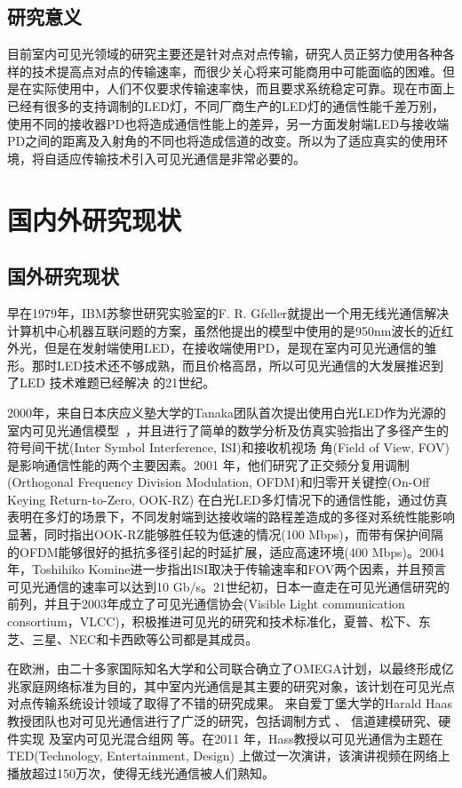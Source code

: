 \subsection{研究意义}

目前室内可见光领域的研究主要还是针对点对点传输，研究人员正努力使用各种各样的技术提高点对点的传输速率，而很少关心将来可能商用中可能面临的困难。但是在实际使用中，人们不仅要求传输速率快，而且要求系统稳定可靠。现在市面上已经有很多的支持调制的LED灯，不同厂商生产的LED灯的通信性能千差万别，使用不同的接收器PD也将造成通信性能上的差异，另一方面发射端LED与接收端PD之间的距离及入射角的不同也将造成信道的改变。所以为了适应真实的使用环境，将自适应传输技术引入可见光通信是非常必要的。

\section{国内外研究现状}\label{sec:stage}
\subsection{国外研究现状}
早在1979年，IBM苏黎世研究实验室的F. R. Gfeller就提出一个用无线光通信解决计算机中心机器互联问题的方案\cite{gfeller1979wireless}，虽然他提出的模型中使用的是950nm波长的近红外光，但是在发射端使用LED，在接收端使用PD，是现在室内可见光通信的雏形。那时LED技术还不够成熟，而且价格高昂，所以可见光通信的大发展推迟到了LED 技术难题已经解决 的21世纪。

2000年，来自日本庆应义塾大学的Tanaka团队首次提出使用白光LED作为光源的室内可见光通信模型\
\cite{tanaka2000wireless}，并且进行了简单的数学分析及仿真实验指出了多径产生的符号间干扰(Inter Symbol Interference, ISI)和接收机视场
角(Field of View, FOV)是影响通信性能的两个主要因素。2001 年，他们研究了正交频分复用调制(Orthogonal Frequency Division Modulation, OFDM)和归零开关键控(On-Off Keying Return-to-Zero, OOK-RZ) 在白光LED多灯情况下的通信性能\cite{tanaka2001indoor}，通过仿真表明在多灯的场景下，不同发射端到达接收端的路程差造成的多径对系统性能影响显著，同时指出OOK-RZ能够胜任较为低速的情况(100 Mbps)，而带有保护间隔的OFDM能够很好的抵抗多径引起的时延扩展，适应高速环境(400 Mbps)。2004年，Toshihiko Komine进一步指出ISI取决于传输速率和FOV两个因素，并且预言可见光通信的速率可以达到10 Gb/s\cite{komine2004fundamental}。21世纪初，日本一直走在可见光通信研究的前列，并且于2003年成立了可见光通信协会(Visible Light
communication consortium，VLCC)，积极推进可见光的研究和技术标准化，夏普、松下、东芝、三星、NEC和卡西欧等公司都是其成员。

在欧洲，由二十多家国际知名大学和公司联合确立了OMEGA计划，以最终形成亿兆家庭网络标准为目的，其中室内光通信是其主要的研究对象，该计划在可见光点对点传输系统设计领域了取得了不错的研究成果\cite{vuvcic2009125,vuvcic2009white,vuvcic2010513,vucic2011803}。 来自爱丁堡大学的Harald Haas教授团队也对可见光通信进行了广泛的研究，包括调制方式
\cite{afgani2006visible,elgala2009indoor,mesleh2010indoor,mesleh2011optical}、 信道建模研究\cite{elgala2009study,elgala2009non}、硬件实现
\cite{stefan2011optical,chun2014demonstration,manousiadis2015demonstration} 及室内可见光混合组网
\cite{wang2015dynamic,stefan2014hybrid,basnayaka2015hybrid} 等。在2011 年，Hass教授以可见光通信为主题在TED(Technology, Entertainment, Design) 上做过一次演讲，该演讲视频在网络上播放超过150万次，使得无线光通信被人们熟知。

